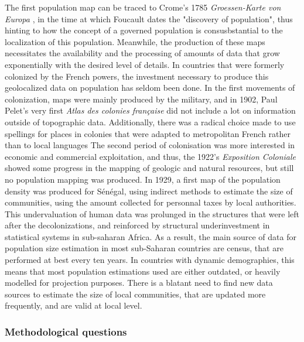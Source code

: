 The first population  map can be traced to Crome's 1785 \textit{Groessen-Karte von Europa} \cite{klawe_population_1973}, in the time at which Foucault dates the "discovery of population"\cite{foucault2004securite}, thus hinting to how the concept of a governed population is consusbstantial to the localization of this population. Meanwhile, the production of these maps necessitates the availability and the processing of amounts of data that grow exponentially with the desired level of details. In countries that were formerly colonized by the French powers, the investment necessary to produce this geolocalized data on population has seldom been done. In the first movements of colonization, maps were mainly produced by the military, and in 1902, Paul Pelet's very first \textit{Atlas des colonies française}\cite{pelet1902atlas} did not include a lot on
information outside of topographic data\cite{zimmermann_atlas_1903}. Additionally, there was a radical choice made to use spellings for places in colonies that were adapted to metropolitan French rather than to local languages\cite{zimmermann_atlas_1903} The second period of colonisation was more interested in economic and commercial exploitation, and thus, the 1922's \textit{Exposition Coloniale} showed some progress in the mapping of geologic and natural resources, but still no population mapping was produced\cite{rambert_cartographie_1922}. In 1929, a first map of the population density was produced for Sénégal, using indirect methods to estimate the size of communities, using the amount collected for personnal taxes by local authorities\cite{rousseau_population_1929}.
This undervaluation of human data was prolunged in the structures that were left after the decolonizations\cite{lohle1999etat}, and reinforced by structural underinvestment in statistical systems in sub-saharan Africa\cite{jerven2013poor}. As a result, the main source of data for population size estimation in most sub-Saharan countries are census, that are performed at best every ten years. In countries with dynamic demographies, this means that most population estimations used are either outdated, or heavily modelled for projection purposes. There is a blatant need to find new data sources to estimate the size of local communities, that are updated more frequently, and are valid at local level.



\subsubsection{Methodological questions}

